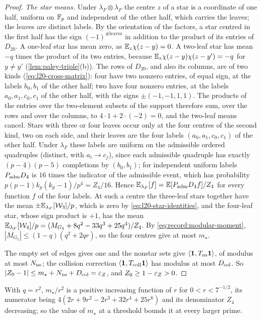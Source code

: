 \begin{proof}
\emph{The star means.} Under $\lambda_F\otimes\lambda_F$ the centre $z$ of a star
is a coordinate of one half, uniform on $\mathbb F_p$ and independent of the other half,
which carries the leaves; the leaves are distinct labels. By the orientation of
the factors, a star centred in the first half has the sign $(-1)^{\#\text{leaves}}$
in addition to the product of its entries of $D_{20}$. A one-leaf star has mean
zero, as $\mathbb E_z\chi(z-y)=0$. A two-leaf star has mean $-q$ times the product of
its two entries, because $\mathbb E_z\chi(z-y)\chi(z-y')=-q$ for $y\ne y'$
(\cref{lem:paley-triple}(b)). The rows of $D_{20}$, and also its columns, are of
two kinds (\eqref{eq:l20-cross-matrix}): four have two nonzero entries, of equal
sign, at the labels $b_0,b_1$ of the other half; two have four nonzero entries,
at the labels $a_0,a_1,c_0,c_1$ of the other half, with the signs
$\pm(-1,-1,1,1)$. The products of the entries
over the two-element subsets of the support therefore sum, over the rows and
over the columns, to $4\cdot1+2\cdot(-2)=0$, and the two-leaf means cancel.
Stars with three or four leaves occur only at the four centres of the second
kind, two on each side, and their leaves are the four labels $(a_0,a_1,c_0,c_1)$
of the other half. Under $\lambda_F$ these labels are uniform on the admissible
ordered quadruples (distinct, with $a_i\to c_j$), since each admissible
quadruple has exactly $(p-4)(p-5)$ completions by $(b_0,b_1)$; for independent
uniform labels $P_{\rm adm}D_4$ is $16$ times the indicator of the admissible
event, which has probability $p(p-1)k_p(k_p-1)/p^4=Z_4/16$. Hence
$\mathbb E_{\lambda_F}[f]=\mathbb E[P_{\rm adm}D_4f]/Z_4$ for every function $f$ of the four labels.
At such a centre the three-leaf stars together have the mean
$\pm\mathbb E_{\lambda_F}[\mathcal W_3]/p$, which is zero by
\eqref{eq:l20-star-identities}, and the four-leaf star, whose sign product is
$+1$, has the mean $\mathbb E_{\lambda_F}[\mathcal W_4]/p
=(M_{G_5}+8q^2-33q^3+25q^4)/Z_4$. By \eqref{eq:record:modular-moment},
$|M_{G_5}|\le(1-q)(q^2+2qr)$, so the four centres give at most $m_\star$.

The empty set of edges gives one and the nonstar sets give
$\left\langle \mathbf 1,T_{\rm ns}\mathbf 1\right\rangle$, of modulus at most $N_{\rm ns}$; the collision
correction $\left\langle \mathbf 1,T_{\rm coll}\mathbf 1\right\rangle$ has modulus at most $D_{\rm col}$. So
$|Z_0-1|\le m_\star+N_{\rm ns}+D_{\rm col}=\varepsilon_Z$, and $Z_0\ge1-\varepsilon_Z>0$.
\end{proof}

With $q=r^2$, $m_\star/r^2$ is a positive increasing function of $r$ for
$0<r<7^{-1/2}$, its numerator being $4(2r+9r^2-2r^3+32r^4+25r^6)$ and its
denominator $Z_4$ decreasing; so the value of $m_\star$ at a threshold bounds it
at every larger prime.

